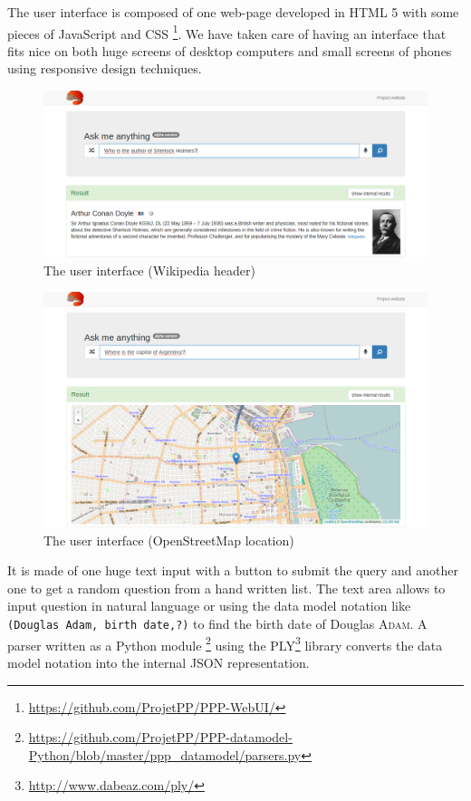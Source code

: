 The user interface is composed of one web-page developed in HTML 5 with some
pieces of JavaScript and CSS \footnote{\url{https://github.com/ProjetPP/PPP-WebUI/}}.
We have taken care of having an
interface that fits nice on both huge screens of desktop computers
and small screens of phones using responsive design techniques.

\begin{figure}[!ht]
    \centering
    \includegraphics[width=1\textwidth]{WebUI.png}
    \caption{The user interface (Wikipedia header)}
\end{figure}

\begin{figure}[!ht]
    \centering
    \includegraphics[width=1\textwidth]{WebUI2.png}
    \caption{The user interface (OpenStreetMap location)}
\end{figure}

It is made of one huge text input with a button to submit
the query and another one to get a random question from a hand written list. The text area
allows to input question in natural language or using the data model notation like
\texttt{(Douglas Adam, birth date,?)} to find the
birth date of Douglas \textsc{Adam}. A parser written as a Python module
\footnote{\url{https://github.com/ProjetPP/PPP-datamodel-Python/blob/master/ppp\_datamodel/parsers.py}}
using
the PLY\footnote{\url{http://www.dabeaz.com/ply/}} library converts
the data model notation into the internal JSON representation.

